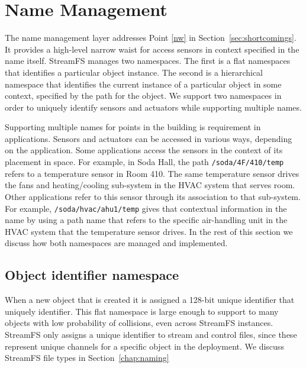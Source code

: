 \section{Name Management}
The name management layer addresses Point \ref{nw} in Section~\ref{sec:shortcomings}.  It provides a high-level
narrow waist for access sensors in context specified in the name itself.
StreamFS manages two namespaces.  The first is a flat namespaces that identifies a particular
object instance.  The second is a hierarchical namespace that identifies the current instance
of a particular object in some context, specified by the path for the object.  
We support two namespaces in order to uniquely identify sensors and actuators while supporting multiple names.

Supporting multiple names for points in the building is requirement in applications.  Sensors and actuators can be accessed in various 
ways, depending on the application.  Some applications access the sensors in the context of its placement 
in space.  For example, in Soda Hall, the path \texttt{/soda/4F/410/temp} refers to a temperature sensor in Room 410.  
The same temperature sensor drives the fans and heating/cooling sub-system in the HVAC system that serves room.
Other applications refer to this sensor through its association to that sub-system.  For example,
\texttt{/soda/hvac/ahu1/temp} gives that contextual information in the name by using a path name that refers to the specific
air-handling unit in the HVAC system that the temperature sensor drives.
In the rest of this section we discuss how both namespaces are managed and implemented.

\subsection{Object identifier namespace}

When a new object that is created it is assigned a 128-bit unique identifier that uniquely identifier. %
This flat namespace is large enough to support to many objects with low probability of collisions, even across
StreamFS instances.
StreamFS only assigns a unique identifier to stream and control files, since these represent unique channels for a specific 
object in the deployment.  We discuss StreamFS file types in Section~\ref{chap:naming}

